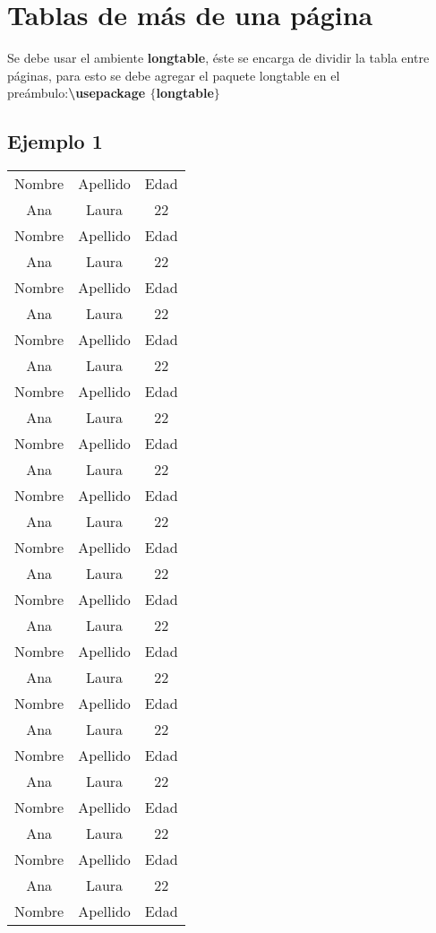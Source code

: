 \documentclass{article}
\begin{document}
\section{Tablas de más de una página}

Se debe usar el ambiente \textbf{longtable}, éste se encarga de dividir la tabla entre páginas,
para esto se debe agregar el paquete longtable en el preámbulo:\textbf{\textbackslash usepackage $\lbrace$longtable$\rbrace$} 

\subsection{Ejemplo 1}
\begin{longtable}{c c c} %
	Nombre & Apellido & Edad \\
	Ana & Laura & 22 \\
	Nombre & Apellido & Edad \\
	Ana & Laura & 22 \\
	Nombre & Apellido & Edad \\
	Ana & Laura & 22 \\
	Nombre & Apellido & Edad \\
	Ana & Laura & 22 \\
	Nombre & Apellido & Edad \\
	Ana & Laura & 22 \\
	Nombre & Apellido & Edad \\
	Ana & Laura & 22 \\
	Nombre & Apellido & Edad \\
	Ana & Laura & 22 \\	
	Nombre & Apellido & Edad \\
	Ana & Laura & 22 \\
	Nombre & Apellido & Edad \\
	Ana & Laura & 22 \\
	Nombre & Apellido & Edad \\
	Ana & Laura & 22 \\
	Nombre & Apellido & Edad \\
	Ana & Laura & 22 \\
	Nombre & Apellido & Edad \\
	Ana & Laura & 22 \\
	Nombre & Apellido & Edad \\
	Ana & Laura & 22 \\	Nombre & Apellido & Edad \\
	Ana & Laura & 22 \\	
	Nombre & Apellido & Edad \\

\end{longtable}
\end{document}
